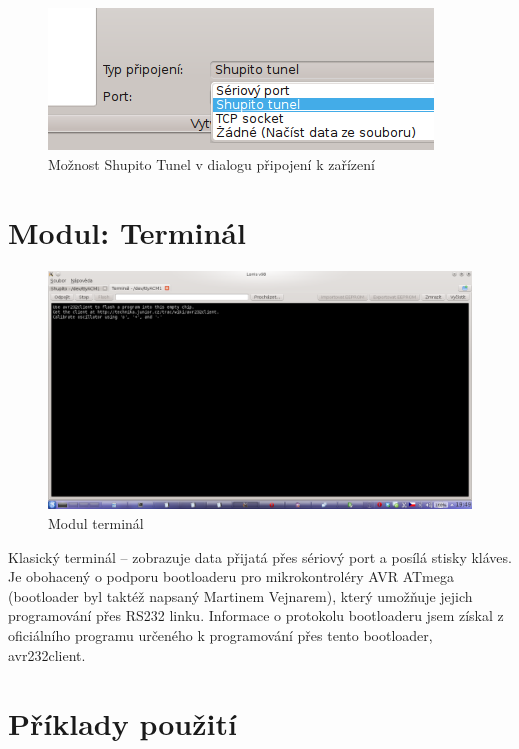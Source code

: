 \documentclass[12pt, a4paper, oneside]{article}
\begin{document}
\begin{figure}[H]
\begin{center}
\includegraphics{img/con_tunel.png}
\caption{Možnost Shupito Tunel v dialogu připojení k zařízení}
\end{center}
\end{figure}

\section{Modul: Terminál}

\begin{figure}[h]
\begin{center}
\includegraphics[width=\textwidth]{img/terminal.png}
\caption{Modul terminál}
\label{Terminal}
\end{center}
\end{figure}

Klasický terminál -- zobrazuje data přijatá přes sériový port a posílá stisky kláves. Je obohacený o podporu bootloaderu pro mikrokontroléry AVR ATmega (bootloader byl taktéž napsaný Martinem Vejnarem), který umožňuje jejich programování přes RS232 linku. Informace o protokolu bootloaderu jsem získal z oficiálního programu určeného k programování přes tento bootloader, avr232client.


\newpage
\section{Příklady použití}
\end{document}
